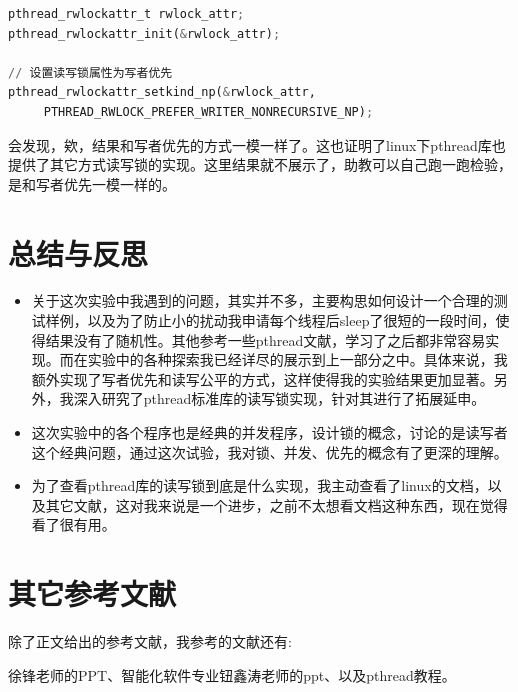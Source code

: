 \documentclass{LabReport}
\begin{document}
	\begin{lstlisting}[language=python,frame=shadowbox]
pthread_rwlockattr_t rwlock_attr;
pthread_rwlockattr_init(&rwlock_attr);

// 设置读写锁属性为写者优先
pthread_rwlockattr_setkind_np(&rwlock_attr,
	 PTHREAD_RWLOCK_PREFER_WRITER_NONRECURSIVE_NP);
	\end{lstlisting}
	
	会发现，欸，结果和写者优先的方式一模一样了。这也证明了linux下pthread库也提供了其它方式读写锁的实现。这里结果就不展示了，助教可以自己跑一跑检验，是和写者优先一模一样的。
	
	
	\section{总结与反思}
	\begin{itemize}
		\item 关于这次实验中我遇到的问题，其实并不多，主要构思如何设计一个合理的测试样例，以及为了防止小的扰动我申请每个线程后sleep了很短的一段时间，使得结果没有了随机性。其他参考一些pthread文献，学习了之后都非常容易实现。而在实验中的各种探索我已经详尽的展示到上一部分之中。具体来说，我额外实现了写者优先和读写公平的方式，这样使得我的实验结果更加显著。另外，我深入研究了pthread标准库的读写锁实现，针对其进行了拓展延申。
		\item 这次实验中的各个程序也是经典的并发程序，设计锁的概念，讨论的是读写者这个经典问题，通过这次试验，我对锁、并发、优先的概念有了更深的理解。
		\item 为了查看pthread库的读写锁到底是什么实现，我主动查看了linux的文档，以及其它文献，这对我来说是一个进步，之前不太想看文档这种东西，现在觉得看了很有用。
	\end{itemize}

	\section{其它参考文献}
	除了正文给出的参考文献，我参考的文献还有:\par\hspace{0em}徐锋老师的PPT、智能化软件专业钮鑫涛老师的ppt、以及pthread教程。
	
\end{document}

